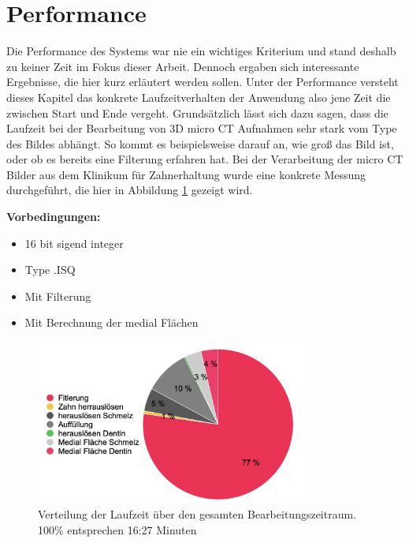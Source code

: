 \section{Performance}
Die Performance des Systems war nie ein wichtiges Kriterium und stand deshalb zu
keiner Zeit im Fokus dieser Arbeit. Dennoch ergaben sich interessante Ergebnisse,
die hier kurz erläutert werden sollen. Unter der Performance versteht dieses
Kapitel das konkrete Laufzeitverhalten der Anwendung also jene Zeit die zwischen
Start und Ende vergeht. Grundsätzlich lässt sich dazu sagen, dass die Laufzeit
bei der Bearbeitung von 3D micro CT Aufnahmen sehr stark vom Type des Bildes
abhängt. So kommt es beispielsweise darauf an, wie groß das Bild ist, oder ob es
bereits eine Filterung erfahren hat. Bei der Verarbeitung der micro CT Bilder
aus dem Klinikum für Zahnerhaltung wurde eine konkrete Messung durchgeführt, die
hier in Abbildung \ref{fig:laufzeit} gezeigt wird.

\textbf{Vorbedingungen:}
\begin{itemize}
	\item 16 bit sigend integer

	\item Type .ISQ

	\item Mit Filterung

	\item Mit Berechnung der medial Flächen
\end{itemize}

\begin{figure}[h]
	\centering
	\includegraphics[width=0.8\textwidth]{img/laufzeit_diagramm.png}
	\caption{Verteilung der Laufzeit über den gesamten Bearbeitungszeitraum. 100\%
	entsprechen 16:27 Minuten}
	\label{fig:laufzeit}
\end{figure}

